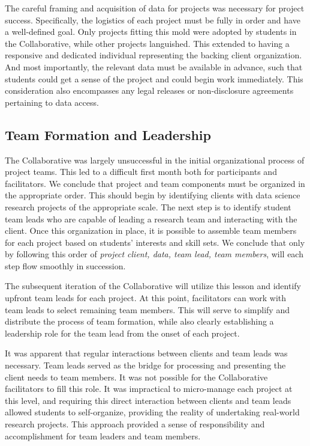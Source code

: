 \documentclass[12pt]{article}
\begin{document}
The careful framing and acquisition of data for projects was necessary for project success.  Specifically, the logistics of each project must be fully in order and have a well-defined goal.  Only projects fitting this mold were adopted by students in the Collaborative, while other projects languished.  This extended to having a responsive and dedicated individual representing the backing client organization.  And most importantly, the relevant data must be available in advance, such that students could get a sense of the project and could begin work immediately.  This consideration also encompasses any legal releases or non-disclosure agreements pertaining to data access.

\subsection{Team Formation and Leadership}

The Collaborative was largely unsuccessful in the initial organizational process of project teams.  This led to a difficult first month both for participants and facilitators.  We conclude that project and team components must be organized in the appropriate order.  This should begin by identifying clients with data science research projects of the appropriate scale.  The next step is to identify student team leads who are capable of leading a research team and interacting with the client.  Once this organization in place, it is possible to assemble team members for each project based on students' interests and skill sets.  We conclude that only by following this order of \emph{project client, data, team lead, team members}, will each step flow smoothly in succession.

The subsequent iteration of the Collaborative will utilize this lesson and identify upfront team leads for each project.  At this point, facilitators can work with team leads to select remaining team members. This will serve to simplify and distribute the process of team formation, while also clearly establishing a leadership role for the team lead from the onset of each project.

It was apparent that regular interactions between clients and team leads was necessary. Team leads served as the bridge for processing and presenting the client needs to team members.  It was not possible for the Collaborative facilitators to fill this role.  It was impractical to micro-manage each project at this level, and requiring this direct interaction between clients and team leads allowed students to self-organize, providing the reality of undertaking real-world research projects.  This approach provided a sense of responsibility and accomplishment for team leaders and team members.
\end{document}
